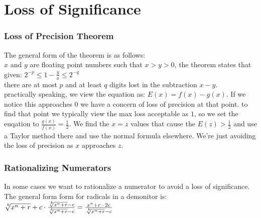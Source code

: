\section{Loss of Significance}


\subsubsection*{Loss of Precision Theorem}
The general form of the theorem is as follows:\\
$x$ and $y$ are floating point numbers such that $x > y > 0$,
the theorem states that given:
$ 2^{-p} \leq 1 - \frac{y}{x} \leq 2^{-q} $\\
there are at most $p$ and at least $q$ digits lost in the subtraction $x-y$.\\

practically speaking, we view the equation as: $E(x) = f(x) - g(x)$. If
we notice this approaches $0$ we have a concern of loss of precision at that point.
to find that point we typically view the max loss acceptable as $1$, so we set
the euqation to $\frac{g(x)}{f(x)} = \frac{1}{2}$. We find the $x = z$ values that cause
the $E(z) > \frac{1}{2}$ and use a Taylor method there and use the normal formula elsewhere.
We're just avoiding the loss of precision as $x$ approaches $z$.

\subsubsection*{Rationalizing Numerators}
In some cases we want to rationalize a numerator to avoid a loss of significance.
The general form form for radicals in a demonitor is:\\
$\sqrt[\leftroot{-2}\uproot{2}k]{x^n + r} + c  \cdot \frac{\sqrt[\leftroot{-2}\uproot{2}k]{x^n + r} - c}{\sqrt[\leftroot{-2}\uproot{2}k]{x^n + r} - c}   =  \frac{x^n + r -2c}{\sqrt[\leftroot{-2}\uproot{2}k]{x^n + r} - c}$\\
